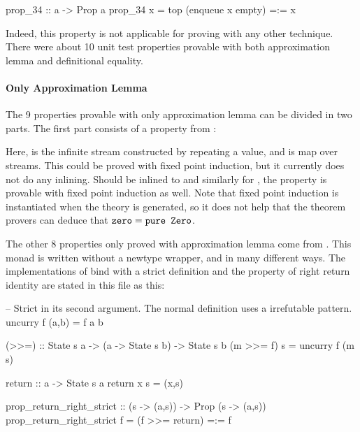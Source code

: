 \begin{code}
prop_34 :: a -> Prop a
prop_34 x = top (enqueue x empty) =:= x
\end{code}

\noindent
Indeed, this property is not applicable for proving with any other
technique. There were about 10 unit test properties provable with both
approximation lemma and definitional equality.

\paragraph{Only Approximation Lemma}
The 9 properties provable with only approximation lemma can be divided
in two parts. The first part consists of a property from :


\noindent
Here,  is the infinite stream constructed by repeating a
value, and \hs{<\$>} is map over streams. This could be proved with
fixed point induction, but it currently does not do any
inlining. Should  be inlined to  and similarly for
, the property is provable with fixed point induction as well.
Note that fixed point induction is instantiated when the theory is
generated, so it does not help that the theorem provers can deduce that $ =
$.

The other 8 properties only proved with approximation lemma come from
. This monad is written without a newtype wrapper, and
in many different ways. The implementations of bind with a strict
 definition and the property of right return identity are
stated in this file as this:

\begin{code}
-- Strict in its second argument. The normal definition uses a irrefutable pattern.
uncurry f (a,b) = f a b

(>>=) :: State s a -> (a -> State s b) -> State s b
(m >>= f) s = uncurry f (m s)

return :: a -> State s a
return x s = (x,s)

prop_return_right_strict :: (s -> (a,s)) -> Prop (s -> (a,s))
prop_return_right_strict f = (f >>= return) =:= f
\end{code}

